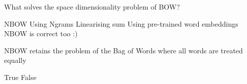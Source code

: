 \documentclass[theme=sleek, randomorder, hidesidemenu]{webquiz}
\begin{document}
\begin{question}

  What solves the space dimensionality problem of BOW?

  \begin{choice}[columns=2, multiple]
    \correct NBOW
    \incorrect Using Ngrams
    \incorrect Linearising sum
    \correct Using pre-trained word embeddings \feedback NBOW is correct too :)
  \end{choice}

\end{question}

\begin{question}

  NBOW retains the problem of the Bag of Words where all words are treated equally

  \begin{choice}[columns=2]
    \incorrect True
    \correct False
  \end{choice}

\end{question}


\end{document}
